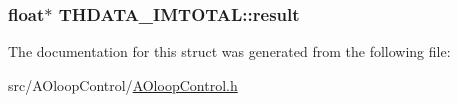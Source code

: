\subsubsection[{result}]{\setlength{\rightskip}{0pt plus 5cm}float$\ast$ T\+H\+D\+A\+T\+A\+\_\+\+I\+M\+T\+O\+T\+A\+L\+::result}\label{structTHDATA__IMTOTAL_a9e7c01abf8aad470594aa818ef3335d8}


The documentation for this struct was generated from the following file\+:\begin{DoxyCompactItemize}
\item 
src/\+A\+Oloop\+Control/\hyperlink{AOloopControl_8h}{A\+Oloop\+Control.\+h}\end{DoxyCompactItemize}

